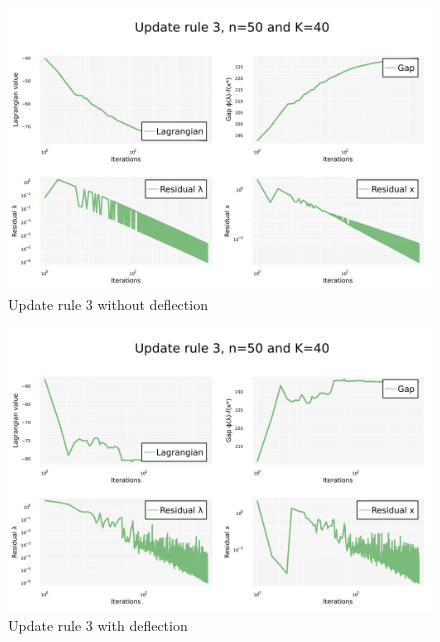 \documentclass[notitlepage]{article}
\begin{document}
\begin{figure}[H]
  \centering
  \includegraphics[scale=0.25]{pics/psd_q/Rule=3_n=50_K=40_defl=false.png}
  \caption{Update rule 3 without deflection}
  \label{fig:rule-3-n-50-k-40-psdQ}
\end{figure}

\begin{figure}[H]
  \centering
  \includegraphics[scale=0.25]{pics/psd_q/Rule=3_n=50_K=40_defl=true.png}
  \caption{Update rule 3 with deflection}
  \label{fig:rule-3-n-50-k-40-defl-psdQ}
\end{figure}

\newpage
\end{document}
